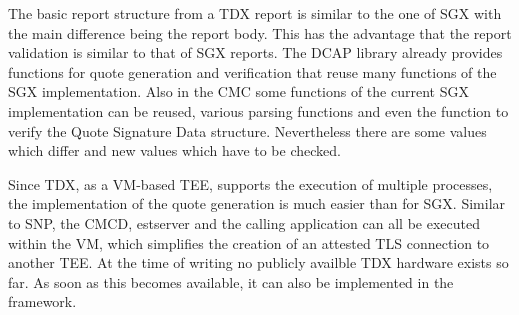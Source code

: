 The basic report structure from a TDX report is similar to the one of SGX with the main difference being the report body. This has the advantage that the report validation is similar to that of SGX reports. 
The DCAP library already provides functions for quote generation and verification that reuse many functions of the SGX implementation. Also in the CMC some functions of the current SGX implementation can be reused, various parsing functions and even the function to verify the Quote Signature Data structure. Nevertheless there are some values which differ and new values which have to be checked. 

Since TDX, as a VM-based TEE, supports the execution of multiple processes, the implementation of the quote generation is much easier than for SGX. Similar to SNP, the CMCD, estserver and the calling application can all be executed within the VM, which simplifies the creation of an attested TLS connection to another TEE.
At the time of writing no publicly availble TDX hardware exists so far. As soon as this becomes available, it can also be implemented in the framework. 